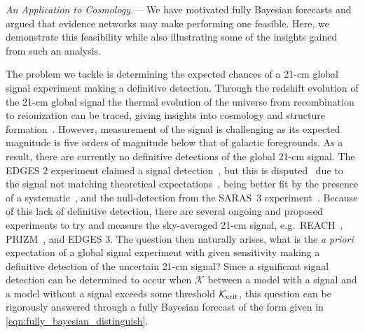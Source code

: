 \documentclass[twocolumn,english,aps,prd,amsmath,amssymb,reprint,floatfix,nofootinbib,showkeys]{revtex4-2}
\newcommand{\br}{\mathcal{K}}
\begin{document}
\textit{An Application to Cosmology.}---
We have motivated fully Bayesian forecasts and argued that evidence networks may make performing one feasible.
Here, we demonstrate this feasibility while also illustrating some of the insights gained from such an analysis. 

The problem we tackle is determining the expected chances of a 21-cm global signal experiment making a definitive detection. 
Through the redshift evolution of the 21-cm global signal the thermal evolution of the universe from recombination to reionization can be traced, giving insights into cosmology and structure formation~\citep[see][for a more detailed introduction to the field]{Furlanetto_2006}. 
However, measurement of the signal is challenging as its expected magnitude is five orders of magnitude below that of galactic foregrounds. 
As a result, there are currently no definitive detections of the global 21-cm signal.
The EDGES 2 experiment claimed a signal detection~\citep{EDGES}, but this is disputed~\citep[e.g.][]{Hills_2018} due to the signal not matching theoretical expectations~\citep[e.g.][]{Barkana_2018}, being better fit by the presence of a systematic~\citep[e.g.][]{Sims_2020}, and the null-detection from the SARAS~3 experiment~\citep{SARAS3}. 
Because of this lack of definitive detection, there are several ongoing and proposed experiments to try and measure the sky-averaged 21-cm signal, e.g.\ REACH~\citep{REACH}, PRIZM~\citep{PRIZM}, and EDGES 3.
The question then naturally arises, what is the \textit{a priori} expectation of a global signal experiment with given sensitivity making a definitive detection of the uncertain 21-cm signal? 
Since a significant signal detection can be determined to occur when $\br$ between a model with a signal and a model without a signal exceeds some threshold $\br_{\rm crit}$, this question can be rigorously answered through a fully Bayesian forecast of the form given in \cref{eqn:fully_bayesian_distinguish}.
\end{document}
